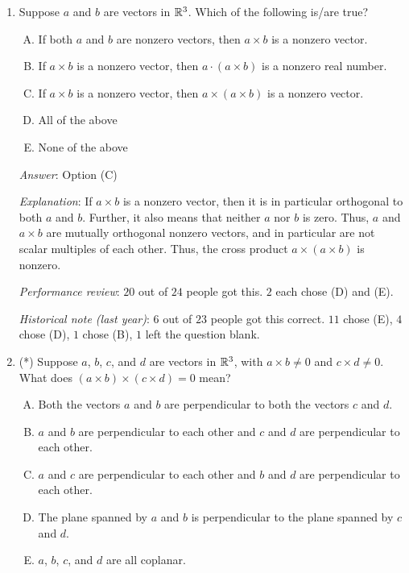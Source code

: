 \documentclass[10pt]{amsart}
\begin{document}
\begin{enumerate}
  {\em Performance review}: $23$ out of $24$ people got this. $1$
  person chose (B).

  {\em Historical note (last year)}: $17$ out of $23$ people got this
  correct. $3$ chose (A), $2$ chose (B), $1$ chose (C).

\item Suppose $a$ and $b$ are vectors in $\mathbb{R}^3$. Which of the
  following is/are true?

  \begin{enumerate}[(A)]
  \item If both $a$ and $b$ are nonzero vectors, then $a \times b$ is
    a nonzero vector.
  \item If $a \times b$ is a nonzero vector, then $a \cdot (a \times
    b)$ is a nonzero real number.
  \item If $a \times b$ is a nonzero vector, then $a \times (a \times
    b)$ is a nonzero vector.
  \item All of the above
  \item None of the above
  \end{enumerate}

  {\em Answer}: Option (C)

  {\em Explanation}: If $a \times b$ is a nonzero vector, then it is
  in particular orthogonal to both $a$ and $b$. Further, it also means
  that neither $a$ nor $b$ is zero. Thus, $a$ and $a \times b$ are
  mutually orthogonal nonzero vectors, and in particular are not
  scalar multiples of each other. Thus, the cross product $a \times (a
  \times b)$ is nonzero.

  {\em Performance review}: $20$ out of $24$ people got this. $2$ each
  chose (D) and (E).

  {\em Historical note (last year)}: $6$ out of $23$ people got this
  correct. $11$ chose (E), $4$ chose (D), $1$ chose (B), $1$ left the
  question blank.

\item (*) Suppose $a$, $b$, $c$, and $d$ are vectors in $\mathbb{R}^3$, with
  $a \times b \ne 0$ and $c \times d \ne 0$. What does $(a \times b)
  \times (c \times d) = 0$ mean?

  \begin{enumerate}[(A)]
  \item Both the vectors $a$ and $b$ are perpendicular to both the
    vectors $c$ and $d$.
  \item $a$ and $b$ are perpendicular to each other and $c$ and $d$
    are perpendicular to each other.
  \item $a$ and $c$ are perpendicular to each other and $b$ and $d$
    are perpendicular to each other.
  \item The plane spanned by $a$ and $b$ is perpendicular to the plane
    spanned by $c$ and $d$.
  \item $a$, $b$, $c$, and $d$ are all coplanar.
  \end{enumerate}


\end{enumerate}
\end{document}

